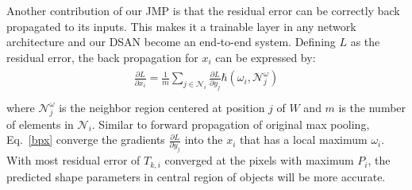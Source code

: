 Another contribution of our JMP is that the residual error can be correctly back propagated to its inputs.
This makes it a trainable layer in any network architecture and our DSAN become an end-to-end system.
Defining $L$ as the residual error, the back propagation for $x_{i}$ can be expressed by:
\begin{eqnarray}\label{bpx}
\begin{aligned}
\frac{\partial L}{\partial x_{i}}=\frac{1}{m}\sum\limits_{j\in\mathcal{N}_{i}}\frac{\partial L}{\partial y_{j}}\hbar(\omega_{i},{\mathcal{N}}^{\omega}_{j})\\
\end{aligned}
\end{eqnarray}
where $\mathcal{N}^{\omega}_{j}$ is the neighbor region centered at position $j$ of $W$ and $m$ is the number of elements in $\mathcal{N}_{i}$.
Similar to forward propagation of original max pooling, Eq.~\ref{bpx} converge the gradients $\frac{\partial L}{\partial y_{j}}$ into the $x_{i}$ that has a local maximum $\omega_{i}$.
With most residual error of $T_{k,i}$ converged at the pixels with maximum $P_i$, the predicted shape parameters in central region of objects will be more accurate.


